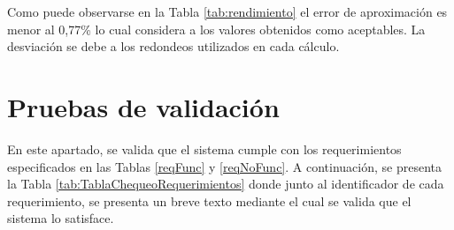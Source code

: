 \par Como puede observarse en la Tabla \ref{tab:rendimiento} el error de aproximación es menor al 0,77\% lo cual considera a los valores obtenidos como aceptables. La desviación se debe a los redondeos utilizados en cada cálculo. 

\section{Pruebas de validación}
 \par En este apartado, se valida que el sistema cumple con los requerimientos especificados en las Tablas \ref{reqFunc} y \ref{reqNoFunc}. A continuación, se presenta la Tabla \ref{tab:TablaChequeoRequerimientos} donde junto al identificador de cada requerimiento, se presenta un breve texto mediante el cual se valida que el sistema lo satisface.

